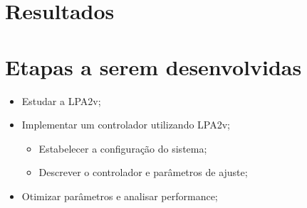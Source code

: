 
\newpage


\section{Resultados}






\section{Etapas a serem desenvolvidas}

\begin{itemize}
\item Estudar a LPA2v;
\item Implementar um controlador utilizando LPA2v;
	\begin{itemize}
	\item Estabelecer a configuração do sistema;
	\item Descrever o controlador e parâmetros de ajuste;
	\end{itemize}
\item Otimizar parâmetros e analisar performance;
\end{itemize}


